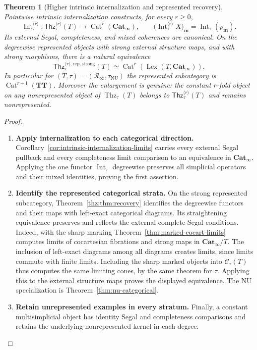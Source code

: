 \documentclass[oneside]{article}
\theoremstyle{plain}
\newtheorem{theorem}{Theorem}[section]
\theoremstyle{definition}
\theoremstyle{remark}
\newcommand{\Cat}{\mathbf{Cat}_{\infty}}
\newcommand{\Int}{\operatorname{Int}}
\newcommand{\Lex}{\operatorname{Lex}}
\newcommand{\NU}{\mathrm{NU}}
\newcommand{\RNU}{\mathcal R_{\infty}}
\newcommand{\TT}{\mathbf{TT}}
\newcommand{\Thz}{\operatorname{Thz}}
\begin{document}
\begin{theorem}[Higher intrinsic internalization and represented recovery]
\label{thm:higher-unrepresented-internalization}
Pointwise intrinsic internalization constructs, for every $r\geq0$,
\begin{equation}\label{eq:higher-unrepresented-internalization}
 \Int_\tau^{\langle r\rangle}:
 \mathsf{Thz}^{\langle r\rangle}_\tau(T)
 \longrightarrow\operatorname{Cat}^r(\Cat),
 \qquad
 \bigl(\Int_\tau^{\langle r\rangle}X\bigr)_{\mathbf m}
 =\Int_\tau(p_{\mathbf m}).
\end{equation}
Its external Segal, completeness, and mixed coherences are canonical.
On the degreewise represented objects with strong external structure
maps, and with strong morphisms, there is a natural equivalence
\[
 \mathsf{Thz}^{\langle r\rangle,\mathrm{rep,strong}}_\tau(T)
 \simeq\operatorname{Cat}^r(\Lex(T,\Cat)).
\]
In particular for $(T,\tau)=(\RNU,\tau_{\NU})$ the represented
subcategory is $\operatorname{Cat}^{r+1}(\TT)$.
Moreover the enlargement is genuine: the constant $r$-fold object on
any nonrepresented object of $\Thz_\tau(T)$ belongs to
$\mathsf{Thz}^{\langle r\rangle}_\tau(T)$ and remains nonrepresented.
\end{theorem}
\begin{proof}
\leavevmode
\begin{enumerate}
\item \textbf{Apply internalization to each categorical direction.}
Corollary~\ref{cor:intrinsic-internalization-limits} carries every
external Segal pullback and every completeness limit comparison to
an equivalence in $\Cat$. Applying the one functor $\Int_\tau$
degreewise preserves all simplicial operators and their mixed
identities, proving the first assertion. 
\item \textbf{Identify the represented categorical strata.}
On the strong represented
subcategory, Theorem~\ref{thz:thm:recovery} identifies the degreewise
functors and their maps with left-exact categorical diagrams. Its
straightening equivalence preserves and reflects the external
complete-Segal conditions. Indeed, with the sharp marking
Theorem~\ref{thm:marked-cocart-limits} computes limits of
cocartesian fibrations and strong maps in $\Cat/T$. The inclusion
of left-exact diagrams among all diagrams creates limits, since
limits commute with finite limits. Including the sharp marked
objects into $\mathscr C_\tau(T)$ thus computes the same limiting
cones, by the same theorem for $\tau$. Applying this to the
external structure maps proves the displayed equivalence. The NU specialization is
Theorem~\ref{thm:nu-categorical}. 
\item \textbf{Retain unrepresented examples in every stratum.}
Finally, a constant multisimplicial
object has identity Segal and completeness comparisons and retains the
underlying nonrepresented kernel in each degree.
\qedhere
\end{enumerate}
\end{proof}
\end{document}
